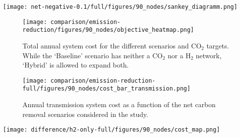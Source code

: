 \documentclass[twocolumn]{article}
\newcommand{\carbon}{CO$_2$}
\newcommand{\hydrogen}{H$_2$}
\newcommand{\hydrogengrid}{\hydrogen{}--Grid}
\begin{document}
\begin{figure*}
    \centering
    \texttt{[image: net-negative-0.1/full/figures/90\_nodes/sankey\_diagramm.png]}
    \caption{Sankey diagram of the optimal operation for a net-negative 10\% scenario.}
    \label{fig:sankey_diagramm}
\end{figure*}

\begin{figure}
    \centering
    \texttt{[image: comparison/emission-reduction/figures/90\_nodes/objective\_heatmap.png]}
    \caption{Total annual system cost for the different scenarios and \carbon{} targets. While the `Baseline' scenario has neither a \carbon{} nor a \hydrogen{} network, `Hybrid' is allowed to expand both.}
    \label{fig:objective_heatmap}
\end{figure}


\begin{figure}[ht]
    \centering
    \texttt{[image: comparison/emission-reduction-full/figures/90\_nodes/cost\_bar\_transmission.png]}
    \caption{Annual transmission system cost as a function of the net carbon removal scenarios considered in the study.}
    \label{fig:cost_bar_transmission}
\end{figure}


\begin{figure*}[ht]
    \centering
    \texttt{[image: difference/h2-only-full/figures/90\_nodes/cost\_map.png]}
    \caption{Difference in cost investments between \hydrogengrid{} and Hybrid model. The left subfigure shows higher spendings per technology and region and transport system for the \hydrogengrid{} model, the right shows higher spendings in the Hydrid model.}
    \label{fig:cost_map_difference}
\end{figure*}
\end{document}
